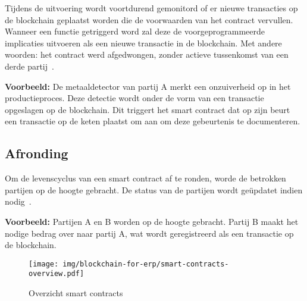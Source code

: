 Tijdens de uitvoering wordt voortdurend gemonitord of er nieuwe transacties op de blockchain geplaatst worden die de voorwaarden van het contract vervullen. Wanneer een functie getriggerd word zal deze de voorgeprogrammeerde implicaties uitvoeren als een nieuwe transactie in de blockchain. Met andere woorden: het contract werd afgedwongen, zonder actieve tussenkomst van een derde partij~\autocite{Delmolino2016}.

\textbf{Voorbeeld:}
De metaaldetector van partij A merkt een onzuiverheid op in het productieproces. Deze detectie wordt onder de vorm van een transactie opgeslagen op de blockchain. Dit triggert het smart contract dat op zijn beurt een transactie op de keten plaatst om aan om deze gebeurtenis te documenteren.

\subsection{Afronding}

Om de levenscyclus van een smart contract af te ronden, worde de betrokken partijen op de hoogte gebracht. De status van de partijen wordt geüpdatet indien nodig~\autocite{Zheng2019}.

\textbf{Voorbeeld:}
Partijen A en B worden op de hoogte gebracht. Partij B maakt het nodige bedrag over naar partij A, wat wordt geregistreerd als een transactie op de blockchain.

\begin{figure}[]
	\centering
	\texttt{[image: img/blockchain-for-erp/smart-contracts-overview.pdf]}
	\caption{\label{fig:smart-contracts-overview}Overzicht smart contracts~\autocite{Zheng2019}}
\end{figure}

